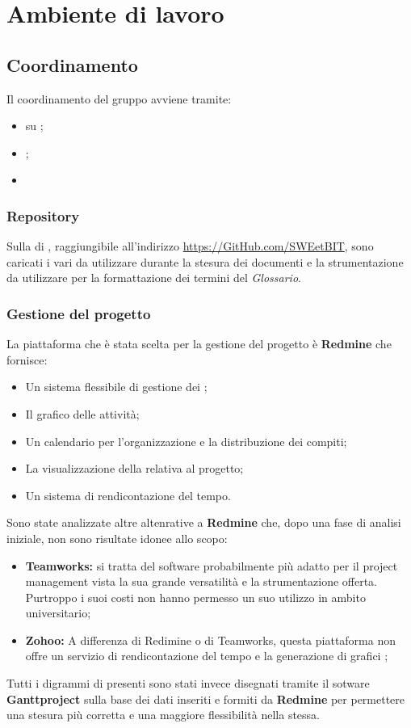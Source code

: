 \section{Ambiente di lavoro}
  \subsection{Coordinamento}
    Il coordinamento del gruppo avviene tramite:
    \begin{itemize}
      \item {} su \textbf{};
      \item {};
      \item {}
    \end{itemize}
    \subsubsection{Repository}
      Sulla  di \textbf{}, raggiungibile all'indirizzo \url{https://GitHub.com/SWEetBIT}, sono caricati i vari  da utilizzare
      durante la stesura dei documenti e la strumentazione da utilizzare per la formattazione dei termini del \emph{Glossario}.
    \subsubsection{Gestione del progetto}
      La piattaforma che è stata scelta per la gestione del progetto è \textbf{Redmine} che fornisce:
      \begin{itemize}
        \item Un sistema flessibile di gestione dei ;
        \item Il grafico  delle attività;
        \item Un calendario per l'organizzazione e la distribuzione dei compiti;
        \item La visualizzazione della  relativa al progetto;
        \item Un sistema di rendicontazione del tempo.
      \end{itemize}
      Sono state analizzate altre altenrative a \textbf{Redmine} che, dopo una fase di analisi iniziale, non sono risultate idonee allo scopo:
      \begin{itemize}
        \item \textbf{Teamworks: }si tratta del software probabilmente più adatto per il project management vista la sua grande versatilità e
        la strumentazione offerta. Purtroppo i suoi costi non hanno permesso un suo utilizzo in ambito universitario;
        \item \textbf{Zohoo: }A differenza di Redimine o di Teamworks, questa piattaforma non offre un servizio di rendicontazione del tempo
        e la generazione di grafici ;
      \end{itemize}
      Tutti i digrammi di  presenti sono stati invece disegnati tramite il sotware \textbf{Ganttproject} sulla base dei dati inseriti e formiti da \textbf{Redmine}
      per permettere una stesura più corretta e una maggiore flessibilità nella stessa.
